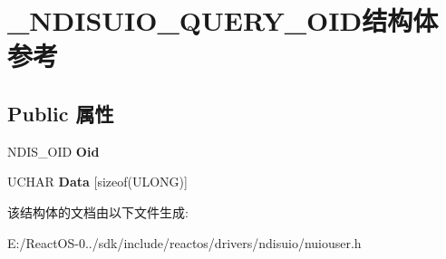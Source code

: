 \hypertarget{struct___n_d_i_s_u_i_o___q_u_e_r_y___o_i_d}{}\section{\+\_\+\+N\+D\+I\+S\+U\+I\+O\+\_\+\+Q\+U\+E\+R\+Y\+\_\+\+O\+I\+D结构体 参考}
\label{struct___n_d_i_s_u_i_o___q_u_e_r_y___o_i_d}
\subsection*{Public 属性}
\begin{DoxyCompactItemize}
\item 
\mbox{\label{struct___n_d_i_s_u_i_o___q_u_e_r_y___o_i_d_aa048dbd77adad7877e6d1fe7e0789d0f}} 
N\+D\+I\+S\+\_\+\+O\+ID {\bfseries Oid}
\item 
\mbox{\label{struct___n_d_i_s_u_i_o___q_u_e_r_y___o_i_d_a9cc035c86135055972edf9b18995e0ed}} 
U\+C\+H\+AR {\bfseries Data} \mbox{[}sizeof(U\+L\+O\+NG)\mbox{]}
\end{DoxyCompactItemize}


该结构体的文档由以下文件生成\+:\begin{DoxyCompactItemize}
\item 
E\+:/\+React\+O\+S-\/0../sdk/include/reactos/drivers/ndisuio/nuiouser.\+h\end{DoxyCompactItemize}

